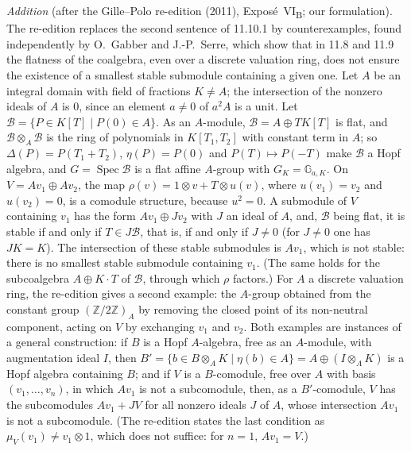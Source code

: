 \par\medskip\noindent
\emph{Addition} (after the Gille--Polo re-edition (2011), Expos\'e~VI\textsubscript{B}; our formulation).
The re-edition replaces the second sentence of 11.10.1 by counterexamples, found independently by O.~Gabber and
J.-P.~Serre, which show that in 11.8 and 11.9 the flatness of the coalgebra, even over a discrete valuation ring,
does not ensure the existence of a smallest stable submodule containing a given one. Let \(A\) be an integral
domain with field of fractions \(K\neq A\); the intersection of the nonzero ideals of \(A\) is \(0\), since an element
\(a\neq0\) of \(a^2A\) is a unit. Let \(\mathcal B=\{P\in K[T]\mid P(0)\in A\}\). As an \(A\)-module,
\(\mathcal B=A\oplus TK[T]\) is flat, and \(\mathcal B\otimes_A\mathcal B\) is the ring of polynomials in
\(K[T_1,T_2]\) with constant term in \(A\); so \(\Delta(P)=P(T_1+T_2)\), \(\eta(P)=P(0)\) and \(P(T)\mapsto P(-T)\)
make \(\mathcal B\) a Hopf algebra, and \(G=\operatorname{Spec}\mathcal B\) is a flat affine \(A\)-group with
\(G_K=\mathbb G_{a,K}\). On \(V=Av_1\oplus Av_2\), the map \(\rho(v)=1\otimes v+T\otimes u(v)\), where \(u(v_1)=v_2\)
and \(u(v_2)=0\), is a comodule structure, because \(u^2=0\). A submodule of \(V\) containing \(v_1\) has the form
\(Av_1\oplus Jv_2\) with \(J\) an ideal of \(A\), and, \(\mathcal B\) being flat, it is stable if and only if
\(T\in J\mathcal B\), that is, if and only if \(J\neq0\) (for \(J\neq0\) one has \(JK=K\)). The intersection of these
stable submodules is \(Av_1\), which is not stable: there is no smallest stable submodule containing \(v_1\). (The
same holds for the subcoalgebra \(A\oplus K\cdot T\) of \(\mathcal B\), through which \(\rho\) factors.) For \(A\) a
discrete valuation ring, the re-edition gives a second example: the \(A\)-group obtained from the constant group
\((\mathbb Z/2\mathbb Z)_A\) by removing the closed point of its non-neutral component, acting on \(V\) by
exchanging \(v_1\) and \(v_2\). Both examples are instances of a general construction: if \(B\) is a Hopf
\(A\)-algebra, free as an \(A\)-module, with augmentation ideal \(I\), then
\(B'=\{b\in B\otimes_AK\mid\eta(b)\in A\}=A\oplus(I\otimes_AK)\) is a Hopf algebra containing \(B\); and if \(V\) is a
\(B\)-comodule, free over \(A\) with basis \((v_1,\ldots,v_n)\), in which \(Av_1\) is not a subcomodule, then, as a
\(B'\)-comodule, \(V\) has the subcomodules \(Av_1+JV\) for all nonzero ideals \(J\) of \(A\), whose intersection
\(Av_1\) is not a subcomodule. (The re-edition states the last condition as \(\mu_V(v_1)\neq v_1\otimes1\), which
does not suffice: for \(n=1\), \(Av_1=V\).)

